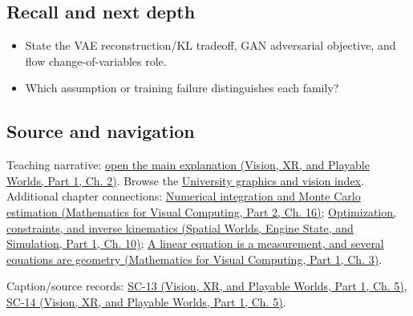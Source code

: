 \subsection{Recall and next depth}\label{appendix-2c568f05ee34-recall-and-next-depth}

\hypertarget{appendix-2c568f05ee34-recall-and-next-depth}{}

\begin{itemize}
\tightlist
\item
  State the VAE reconstruction/KL tradeoff, GAN adversarial objective, and flow change-of-variables role.
\item
  Which assumption or training failure distinguishes each family?
\end{itemize}

\subsection{Source and navigation}\label{appendix-2c568f05ee34-source-and-navigation}

\hypertarget{appendix-2c568f05ee34-source-and-navigation}{}

Teaching narrative: \href{../07-Vision-XR-and-Playable-Worlds-P01/main.pdf\#04-visual-computing-ii-ch031-generative-models-learn-distributions-and-samplers}{open the main explanation (Vision, XR, and Playable Worlds, Part 1, Ch. 2)}. Browse the \hyperref[appendix-a6d556a4ef50-university-graphics-vision-and-photography---independent-series]{University graphics and vision index}. Additional chapter connections: \href{../02-Mathematics-for-Visual-Computing-P02/main.pdf\#03-visual-computing-i-ch012-numerical-integration-and-monte-carlo-estimation}{Numerical integration and Monte Carlo estimation (Mathematics for Visual Computing, Part 2, Ch. 16)}; \href{../05-Spatial-Worlds-Engine-State-and-Simulation-P01/main.pdf\#04-visual-computing-ii-ch029-optimization-constraints-and-inverse-kinematics}{Optimization, constraints, and inverse kinematics (Spatial Worlds, Engine State, and Simulation, Part 1, Ch. 10)}; \href{../02-Mathematics-for-Visual-Computing-P01/main.pdf\#01-foundations-i-ch019-a-linear-equation-is-a-measurement-and-several-equations-are-geometry}{A linear equation is a measurement, and several equations are geometry (Mathematics for Visual Computing, Part 1, Ch. 3)}.

Caption/source records: \href{../07-Vision-XR-and-Playable-Worlds-P01/main.pdf\#04-visual-computing-ii-ch036-sc-13---stanford-cs231n-deep-learning-for-computer-vision-spring-2025-lecture-13-generative-models-1}{SC-13 (Vision, XR, and Playable Worlds, Part 1, Ch. 5)}, \href{../07-Vision-XR-and-Playable-Worlds-P01/main.pdf\#04-visual-computing-ii-ch036-sc-14---stanford-cs231n-deep-learning-for-computer-vision-spring-2025-lecture-14-generative-models-2}{SC-14 (Vision, XR, and Playable Worlds, Part 1, Ch. 5)}.

